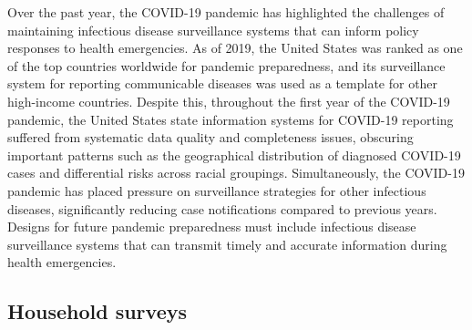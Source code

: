 \documentclass[
]{report}
\begin{document}
Over the past year, the COVID-19 pandemic has highlighted the challenges of maintaining infectious disease surveillance systems that can inform policy responses to health emergencies. As of 2019, the United States was ranked as one of the top countries worldwide for pandemic preparedness,\autocite{JohnsHopkinsCenterforHealthSecurity2019} and its surveillance system for reporting communicable diseases was used as a template for other high-income countries.\autocite{Bagherian2017} Despite this, throughout the first year of the COVID-19 pandemic, the United States state information systems for COVID-19 reporting suffered from systematic data quality and completeness issues, obscuring important patterns such as the geographical distribution of diagnosed COVID-19 cases\autocite{Gold2021} and differential risks across racial groupings.\autocite{Krieger2020} Simultaneously, the COVID-19 pandemic has placed pressure on surveillance strategies for other infectious diseases, significantly reducing case notifications compared to previous years.\autocite{Kwak2020} Designs for future pandemic preparedness must include infectious disease surveillance systems that can transmit timely and accurate information during health emergencies.

\hypertarget{household-surveys}{%
\subsection{Household surveys}\label{household-surveys}}
\end{document}
